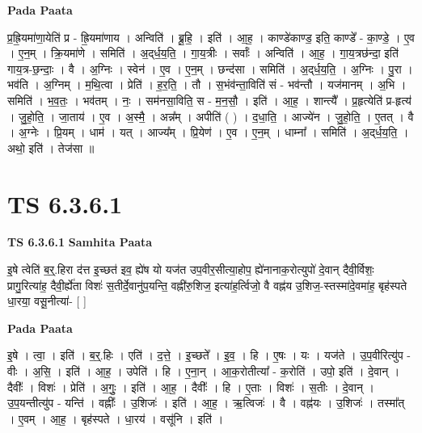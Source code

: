 \documentclass[17pt]{extarticle}
\begin{document}
\textbf{Pada Paata} \newline

प्र॒ह्रि॒यमा॑णा॒येति॑ प्र - ह्रि॒यमा॑णाय । अन्विति॑ । ब्रू॒हि॒ । इति॑ । आ॒ह॒ । काण्डे॑काण्ड॒ इति॒ काण्डे᳚ - का॒ण्डे॒ । ए॒व । ए॒न॒म् । क्रि॒यमा॑णे । समिति॑ । अ॒द्‌र्ध॒य॒ति॒ । गा॒य॒त्रीः । सर्वाः᳚ । अन्विति॑ । आ॒ह॒ । गा॒य॒त्रछ॑न्दा॒ इति॑ गाय॒त्र-छ॒न्दाः॒ । वै । अ॒ग्निः । स्वेन॑ । ए॒व । ए॒न॒म् । छन्द॑सा । समिति॑ । अ॒द्‌र्ध॒य॒ति॒ । अ॒ग्निः । पु॒रा । भव॑ति । अ॒ग्निम् । म॒थि॒त्वा । प्रेति॑ । ह॒र॒ति॒ । तौ । स॒भंव॑न्ता॒विति॑ सं - भव॑न्तौ । यज॑मानम् । अ॒भि । समिति॑ । भ॒व॒तः॒ । भव॑तम् । नः॒ । सम॑नसा॒विति॒ स - म॒न॒सौ॒ । इति॑ । आ॒ह॒ । शान्त्यै᳚ । प्र॒हृत्येति॑ प्र-हृत्य॑ । जु॒हो॒ति॒ । जा॒ताय॑ । ए॒व । अ॒स्मै॒ । अन्न᳚म् । अपीति॑ ( ) । द॒धा॒ति॒ । आज्ये॑न । जु॒हो॒ति॒ । ए॒तत् । वै । अ॒ग्नेः । प्रि॒यम् । धाम॑ । यत् । आज्य᳚म् । प्रि॒येण॑ । ए॒व । ए॒न॒म् । धाम्ना᳚ । समिति॑ । अ॒द्‌र्ध॒य॒ति॒ । अथो॒ इति॑ । तेज॑सा ॥  \newline




\section*{ TS 6.3.6.1 }

\textbf{TS 6.3.6.1 } \newline
\textbf{Samhita Paata} \newline

इ॒षे त्वेति॑ ब॒र्॒.हिरा द॑त्त इ॒च्छत॑ इव॒ ह्ये॑ष यो यज॑त उप॒वीर॒सीत्या॒होप॒ ह्ये॑नानाक॒रोत्युपो॑ दे॒वान् दैवी॒र्विशः॒ प्रागु॒रित्या॑ह॒ दैवी॒र्ह्ये॑ता विशः॑ स॒तीर्दे॒वानु॑प॒यन्ति॒ वह्नी॑रु॒शिज॒ इत्या॑ह॒र्त्विजो॒ वै वह्न॑य उ॒शिज॒-स्तस्मा॑दे॒वमा॑ह॒ बृह॑स्पते धा॒रया॒ वसू॒नीत्या॑- [  ] \newline

\textbf{Pada Paata} \newline

इ॒षे । त्वा॒ । इति॑ । ब॒र्॒.हिः । एति॑ । द॒त्ते॒ । इ॒च्छते᳚ । इ॒व॒ । हि । ए॒षः । यः । यज॑ते । उ॒प॒वीरित्यु॑प - वीः । अ॒सि॒ । इति॑ । आ॒ह॒ । उपेति॑ । हि । ए॒ना॒न् । आ॒क॒रोतीत्या᳚ - क॒रोति॑ । उपो॒ इति॑ । दे॒वान् । दैवीः᳚ । विशः॑ । प्रेति॑ । अ॒गुः॒ । इति॑ । आ॒ह॒ । दैवीः᳚ । हि । ए॒ताः । विशः॑ । स॒तीः । दे॒वान् । उ॒प॒यन्तीत्यु॑प - यन्ति॑ । वह्नीः᳚ । उ॒शिजः॑ । इति॑ । आ॒ह॒ । ऋ॒त्विजः॑ । वै । वह्न॑यः । उ॒शिजः॑ । तस्मा᳚त् । ए॒वम् । आ॒ह॒ । बृह॑स्पते । धा॒रय॑ । वसू॑नि । इति॑ ।  \newline
\end{document}
